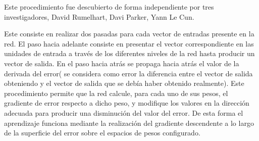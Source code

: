 Este procedimiento fue descubierto de forma independiente por tres
investigadores, David Rumelhart, Davi Parker, Yann Le Cun. 

Este consiste en realizar dos pasadas para cada vector de entradas presente en
la red. El paso hacia adelante consiste en presentar el vector correspondiente
en las unidades de entrada a través de los diferentes niveles de la red hasta
producir un vector de salida.  En el paso hacia atrás se propaga hacia atrás el
valor de la derivada del error( se considera como error la diferencia entre el
vector de salida obteniendo y el vector de salida que se debía haber obtenido
realmente). Este procedimiento permite que la red calcule, para cada uno de sus
pesos, el gradiente de error respecto a dicho peso, y modifique los valores en
la dirección adecuada para producir una disminución del valor del error. De
esta forma el aprendizaje funciona mediante la realización del gradiente
descendente a lo largo de la superficie del error sobre el espacios de pesos
configurado. \cite{paralelas1987facultad}


